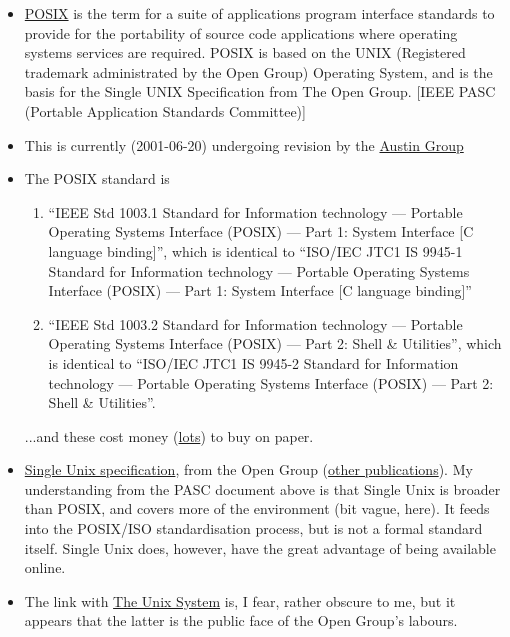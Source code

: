 \documentclass[11pt,oneside,chapters]{starlink}
\begin{document}
\begin{itemize}
\item
\href{http://www.pasc.org/abstracts/posix.htm}{POSIX}
is the term for a suite of applications program
interface standards to provide for the portability of source code
applications where operating systems services are required. POSIX is
based on the UNIX (Registered trademark administrated by the Open
Group) Operating System, and is the basis for the Single UNIX
Specification from The Open Group.
[IEEE PASC (Portable Application Standards Committee)]

\item
This is currently (2001-06-20) undergoing revision by the
\href{http://www.opengroup.org/austin}{Austin Group}

\item
The POSIX standard is

\begin{enumerate}
\item
``IEEE Std 1003.1 Standard for Information technology --- Portable
Operating Systems Interface (POSIX) --- Part 1: System Interface [C
language binding]'', which is identical to ``ISO/IEC JTC1 IS 9945-1
Standard for Information technology --- Portable Operating Systems
Interface (POSIX) --- Part 1: System Interface [C language binding]''

\item
``IEEE Std 1003.2 Standard for Information technology --- Portable
Operating Systems Interface (POSIX) --- Part 2: Shell \& Utilities'',
which is identical to ``ISO/IEC JTC1 IS 9945-2 Standard for
Information technology --- Portable Operating Systems Interface (POSIX)
--- Part 2: Shell \& Utilities''.
\end{enumerate}

...and these cost money
(\href{http://standards.ieee.org/catalog/olis/licenses/licenses.html}{lots})
to buy on paper.

\item
\href{http://www.opengroup.org/onlinepubs/007908799/}{Single Unix specification},
from the Open Group
(\href{http://www.opengroup.org/publications/catalog/web.htm}{other publications}).
My understanding from the PASC document above is
that Single Unix is broader than POSIX, and covers more of the
environment (bit vague, here).  It feeds into the POSIX/ISO
standardisation process, but is not a formal standard itself.  Single
Unix does, however, have the great advantage of being available
online.

\item
The link with
\href{http://www.UNIX-systems.org/}{The Unix System} is, I fear,
rather obscure to me, but it appears that
the latter is the public face of the Open Group's
labours.


\end{itemize}
\end{document}
